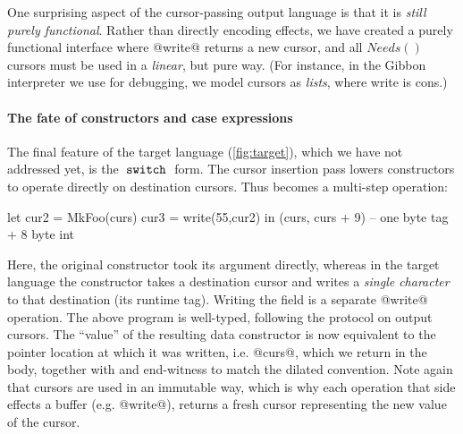 \documentclass[a4paper,english]{lipics-v2016}
\newcommand{\treelang}{Gibbon\xspace} %
\begin{document}
One surprising aspect of the cursor-passing output language is that it is {\em
  still purely functional}.  Rather than directly encoding effects, we have
created a purely functional interface where @write@ returns a new cursor, and
all $Needs()$ cursors must be used in a {\em linear}, but pure way.
%
(For instance, in the \treelang interpreter we use for debugging, we model cursors as {\em
  lists}, where write is cons.)

\newcommand{\END}[1]{\ensuremath{\overline{#1}}}





\paragraph*{The fate of constructors and case expressions}

The final feature of the target language (\cref{fig:target}), which we have not
addressed yet, is the $\; \texttt{switch} \;$ form.
%
The cursor insertion pass lowers constructors to operate directly on destination
cursors.  Thus  becomes a multi-step operation:

\begin{code}
  let cur2 = MkFoo(curs)
      cur3 = write(55,cur2)
  in (curs, curs + 9) -- one byte tag + 8 byte int
\end{code}

Here, the original constructor took its argument directly, whereas in the target
language the constructor takes a destination cursor and writes a {\em single
  character} to that destination (its runtime tag).  Writing the field is a
separate @write@ operation.
%
The above program is well-typed, following the protocol on output cursors.
%
The ``value'' of the resulting data constructor is now equivalent to the pointer
location at which it was written, i.e. @curs@, which we return in the body,
together with and end-witness to match the dilated convention.
%
Note again that cursors are used in an immutable way, which is why each
operation that side effects a buffer (e.g. @write@), returns a fresh cursor
representing the new value of the cursor.
\end{document}
